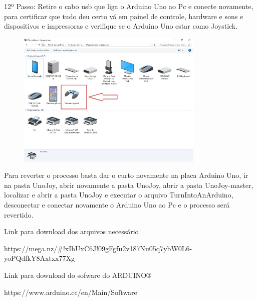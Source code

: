 \documentclass[
	12pt,			%
	openright,		%
	oneside,			%
	a4paper,			%
	chapter=TITLE,		%
	english,			%
	brazil,			%
	]{abntex2}
\begin{document}
\begin{anexosenv}
12º Passo: Retire o cabo usb que liga o Arduino Uno ao Pc e conecte novamente, para certificar que tudo deu certo vá em painel de controle, hardware e sons e dispositivos e impressoras e verifique se o Arduino Uno estar como Joystick.

\begin{figure}[H]
	\centering
		\includegraphics[width=0.8\textwidth]{./img/anex-img-19.jpg}
\end{figure}

Para reverter o processo basta dar o curto novamente na placa Arduino Uno, ir na pasta UnoJoy, abrir novamente a pasta UnoJoy, abrir a pasta UnoJoy-master, localizar e abrir a pasta UnoJoy e executar o arquivo TurnIntoAnArduino, desconectar e conectar novamente o Arduino Uno ao Pc e o processo será revertido.

Link para download dos arquivos necessário

https://mega.nz/\#!xIhUxC6J!09gFgfu2v187Nu05q7ybW0L6-yoPQdfkY8Axtxx77Xg

Link para download do sofware do ARDUINO® 

https://www.arduino.cc/en/Main/Software

\end{anexosenv}


\printindex
\end{document}
